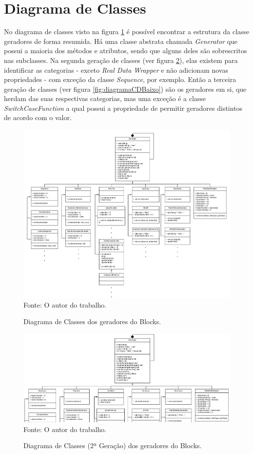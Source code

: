 \documentclass[
	12pt,				%
	openright,			%
	oneside,			%
	a4paper,			%
	english,			%
	brazil				%
	]{abntex2}
\begin{document}
	\section{Diagrama de Classes}
	No diagrama de classes visto na figura \ref{fig:diagramaCD} é possível encontrar a estrutura da classe geradores de forma resumida.
	Há uma classe abstrata chamada \emph{Generator} que possui a maioria dos métodos e atributos, sendo que alguns deles são sobrescritos nas subclasses.
	Na segunda geração de classes (ver figura \ref{fig:diagramaCDCima}), elas existem para identificar as categorias - exceto \emph{Real Data Wrapper} e não adicionam novas propriedades - com exceção da classe \emph{Sequence}, por exemplo.
	Então a terceira geração de classes (ver figura \ref{fig:diagramaCDBaixo}) são os geradores em si, que herdam das suas respectivas categorias, mas uma exceção é a classe \emph{SwitchCaseFunction} a qual possui a propriedade de permitir geradores distintos de acordo com o valor.
	\begin{figure}[h!]
		\centering
		\caption{Diagrama de Classes dos geradores do Blocks.}
		\includegraphics[width=\linewidth]{./figures/prototipo/DiagramadeClasseGeradores.png}
		\label{fig:diagramaCD}
		\footnotesize Fonte: O autor do trabalho.
	\end{figure}
	
	\begin{figure}[h!]
		\centering
		\caption{Diagrama de Classes (2ª Geração) dos geradores do Blocks.}
		\includegraphics[width=\linewidth]{./figures/prototipo/DiagramadeClasseGeradoresCima.png}
		\label{fig:diagramaCDCima}
		\footnotesize Fonte: O autor do trabalho.
	\end{figure}
\end{document}
